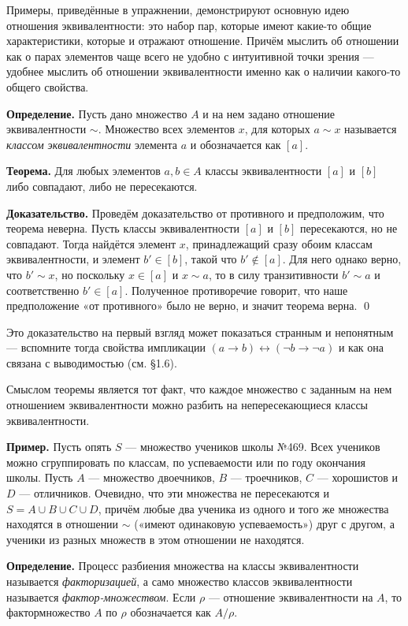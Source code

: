 Примеры, приведённые в упражнении, демонстрируют основную идею отношения эквивалентности: это набор пар, которые имеют какие-то общие характеристики, которые и отражают отношение. Причём мыслить об отношении как о парах элементов чаще всего не удобно с интуитивной точки зрения — удобнее мыслить об отношении эквивалентности именно как о наличии какого-то общего свойства.

{\bfseries Определение.} Пусть дано множество $A$ и на нем задано отношение эквивалентности $\sim$. Множество всех элементов $x$, для которых $a\sim x$ называется {\slshape классом эквивалентности} элемента $a$ и обозначается как $[a]$.

{\bfseries Теорема.} Для любых элементов $a, b \in A$ классы эквивалентности $[a]$ и $[b]$ либо совпадают, либо не пересекаются.

{\bfseries Доказательство.} Проведём доказательство от противного и предположим, что теорема неверна. Пусть классы эквивалентности $[a]$ и $[b]$ пересекаются, но не совпадают. Тогда найдётся элемент $x$, принадлежащий сразу обоим классам эквивалентности, и элемент $b' \in [b]$, такой что $b' \not\in [a]$. Для него однако верно, что $b' \sim x$, но поскольку $x \in [a]$ и $x\sim a$, то в силу транзитивности $b' \sim a$ и соответственно $b' \in [a]$. Полученное противоречие говорит, что наше предположение «от противного» было не верно, и значит теорема верна. \qed

Это доказательство на первый взгляд может показаться странным и непонятным — вспомните тогда свойства импликации $(a\rightarrow b) \leftrightarrow (\neg b \rightarrow \neg a)$ и как она связана с выводимостью (см. §1.6).

Смыслом теоремы является тот факт, что каждое множество с заданным на нем отношением эквивалентности можно разбить на непересекающиеся классы эквивалентности.

{\bfseries Пример.} Пусть опять $S$ — множество учеников школы №469. Всех учеников можно сгруппировать по классам, по успеваемости или по году окончания школы. Пусть $A$ — множество двоечников, $B$ — троечников, $C$ — хорошистов и $D$ — отличников. Очевидно, что эти множества не пересекаются и $S = A\cup B\cup C\cup D$, причём любые два ученика из одного и того же множества находятся в отношении $\sim$ («имеют одинаковую успеваемость») друг с другом, а ученики из разных множеств в этом отношении не находятся.

{\bfseries Определение.} Процесс разбиения множества на классы эквивалентности называется {\slshape факторизацией}, а само множество классов эквивалентности называется {\slshape фактор-множеством}. Если $\rho$ — отношение эквивалентности на $A$, то фактормножество $A$ по $\rho$ обозначается как $A/\rho$.

